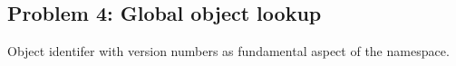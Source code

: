 \subsection{Problem 4: Global object lookup}
Object identifer with version numbers as fundamental aspect of the namespace.

%


























